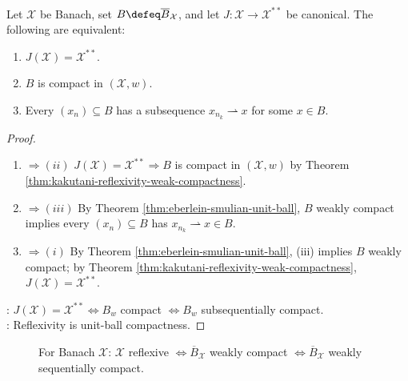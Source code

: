 \begin{corollary} \label{cor:weak-compactness-reflexivity-characterization} \\
Let $\mathcal{X}$ be Banach, set $B\defeq\overline{B}_{\mathcal{X}}$, and let $J:\mathcal{X}\to\mathcal{X}^{**}$ be canonical. The following are equivalent:
\begin{enumerate}[label=(\roman*)]
\setlength{\itemsep}{0pt}
\item $J(\mathcal{X})=\mathcal{X}^{**}$.
\item $B$ is compact in $(\mathcal{X},w)$.
\item Every $(x_n)\subseteq B$ has a subsequence $x_{n_k}\rightharpoonup x$ for some $x\in B$.
\end{enumerate}
\begin{proof}
\begin{enumerate}[label=(\roman*)]
\setlength{\itemsep}{0pt}
\item[$(i)$]$\Rightarrow (ii)$ $J(\mathcal{X})=\mathcal{X}^{**}\Rightarrow B$ is compact in $(\mathcal{X},w)$ by Theorem \ref{thm:kakutani-reflexivity-weak-compactness}.
\item[$(ii)$]$\Rightarrow (iii)$ By Theorem \ref{thm:eberlein-smulian-unit-ball}, $B$ weakly compact implies every $(x_n)\subseteq B$ has $x_{n_k}\rightharpoonup x\in B$.
\item[$(iii)$]$\Rightarrow (i)$ By Theorem \ref{thm:eberlein-smulian-unit-ball}, (iii) implies $B$ weakly compact; by Theorem \ref{thm:kakutani-reflexivity-weak-compactness}, $J(\mathcal{X})=\mathcal{X}^{**}$.
\end{enumerate}
: $J(\mathcal X)=\mathcal X^{**}\Longleftrightarrow B_w$ compact $\Longleftrightarrow B_w$ subsequentially compact.\\
: Reflexivity is unit-ball compactness.
\end{proof}
\end{corollary}

\begin{figure}[H]
  \centering
  
  \caption{For Banach $\mathcal X$: $\mathcal X$ reflexive $\Longleftrightarrow \overline B_{\mathcal X}$ weakly compact $\Longleftrightarrow \overline B_{\mathcal X}$ weakly sequentially compact.}
  \label{fig:weak-compactness-reflexivity-triangle}
\end{figure}

